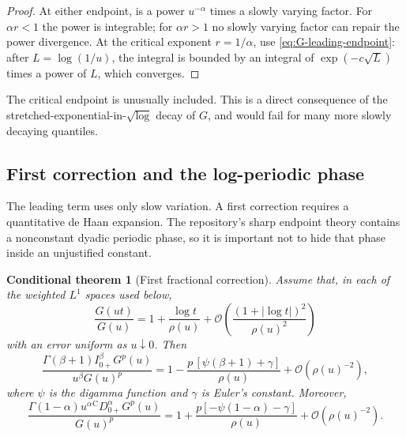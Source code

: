 \documentclass[11pt,oneside]{article}
\newtheorem{conditionaltheorem}[theorem]{Conditional theorem}
\theoremstyle{definition}
\theoremstyle{remark}
\newcommand{\bigO}{\mathcal O}
\newcommand{\Caputo}{\mathrm C}
\begin{document}
\begin{proof}
At either endpoint,  is a power
$u^{-\alpha}$ times a slowly varying factor.  For $\alpha r<1$ the power is
integrable; for $\alpha r>1$ no slowly varying factor can repair the power
divergence.  At the critical exponent $r=1/\alpha$, use
\eqref{eq:G-leading-endpoint}: after $L=\log(1/u)$, the integral is bounded by
an integral of $\exp(-c\sqrt L)$ times a power of $L$, which converges.
\end{proof}

The critical endpoint is unusually included.  This is a direct consequence
of the stretched-exponential-in-$\sqrt{\log}$ decay of $G$, and would fail for
many more slowly decaying quantiles.

\subsection{First correction and the log-periodic phase}

The leading term uses only slow variation.  A first correction requires a
quantitative de Haan expansion.  The repository's sharp endpoint theory
contains a nonconstant dyadic periodic phase, so it is important not to hide
that phase inside an unjustified constant.

\begin{conditionaltheorem}[First fractional correction]
\label{thm:first-correction}
Assume that, in each of the weighted $L^1$ spaces used below,
\begin{equation}
 \frac{G(ut)}{G(u)}
 =1+\frac{\log t}{\rho(u)}
 +\bigO\!\left(\frac{(1+|\log t|)^2}{\rho(u)^2}\right)
 \label{eq:de-Haan-assumption}
\end{equation}
with an error uniform as $u\downarrow0$.  Then
\begin{equation}
 \frac{\Gamma(\beta+1)I_{0+}^{\beta}G^p(u)}
      {u^\beta G(u)^p}
 =1-\frac{p\,[\psi(\beta+1)+\gamma]}{\rho(u)}
 +\bigO(\rho(u)^{-2}),
 \label{eq:RL-first-correction}
\end{equation}
where $\psi$ is the digamma function and $\gamma$ is Euler's constant.
Moreover,
\begin{equation}
 \frac{\Gamma(1-\alpha)u^\alpha
       {}^{\Caputo}D_{0+}^{\alpha}G^p(u)}{G(u)^p}
 =1+\frac{p[-\psi(1-\alpha)-\gamma]}{\rho(u)}
 +\bigO(\rho(u)^{-2}).
 \label{eq:Caputo-first-correction}
\end{equation}
\end{conditionaltheorem}
\end{document}
